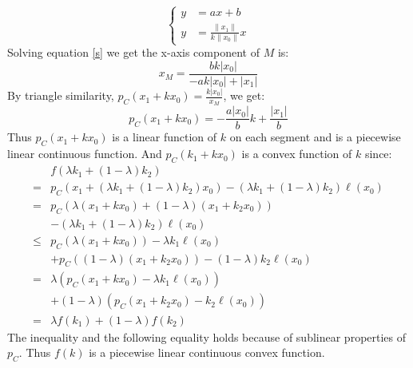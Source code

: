 \documentclass{article}
\newcommand{\abs}[1]{\left\lvert#1\right\rvert}
\begin{document}
\begin{equation}\label{s}
	\left\{
	\begin{aligned}%
		 y & =ax+b                                        \\
		 y & =\frac{\lVert x_1\rVert}{k\lVert x_0\rVert}x
	\end{aligned}
	\right.
\end{equation}
Solving equation \eqref{s} we get the x-axis component of $M$ is:
\begin{equation*}
	x_M=\frac{bk\abs{x_0}}{-ak\abs{x_0}+\abs{x_1}}
\end{equation*}
By triangle similarity, $p_C(x_1+kx_0)=\frac{k\abs{x_0}}{x_M}$,
we get:
\begin{equation}\label{explicit p}
	p_C(x_1+kx_0)=-\frac{a\abs{x_0}}{b}k+\frac{\abs{x_1}}{b}
\end{equation}
Thus $p_C(x_1+kx_0)$ is a linear function of $k$ on each segment and is a piecewise linear continuous function. And $p_C(k_1+kx_0)$ is a convex 
function of $k$ since:
\begin{align*}
	     & f(\lambda k_1+(1-\lambda)k_2)                                                  \\
	=    & p_C(x_1+(\lambda k_1+(1-\lambda)k_2)x_0)-(\lambda k_1+(1-\lambda)k_2)\ell(x_0) \\
	=    & p_C(\lambda(x_1+kx_0)+(1-\lambda)(x_1+k_2x_0))                                 \\
	     & -(\lambda k_1+(1-\lambda)k_2)\ell(x_0)                                         \\
	\leq & p_C(\lambda(x_1+kx_0))-\lambda k_1\ell(x_0)                                    \\
	     & +p_C((1-\lambda)(x_1+k_2x_0))-(1-\lambda)k_2\ell(x_0)                          \\
	=    & \lambda (p_C(x_1+kx_0)-\lambda k_1\ell(x_0))                                   \\
	     & + (1-\lambda)(p_C(x_1+k_2x_0)-k_2\ell(x_0))                                    \\
	=    & \lambda f(k_1)+(1-\lambda)f(k_2)
\end{align*}
The inequality and the following equality holds because of sublinear properties of $p_C$. Thus
$f(k)$ is a piecewise linear continuous convex function.
\end{document}
